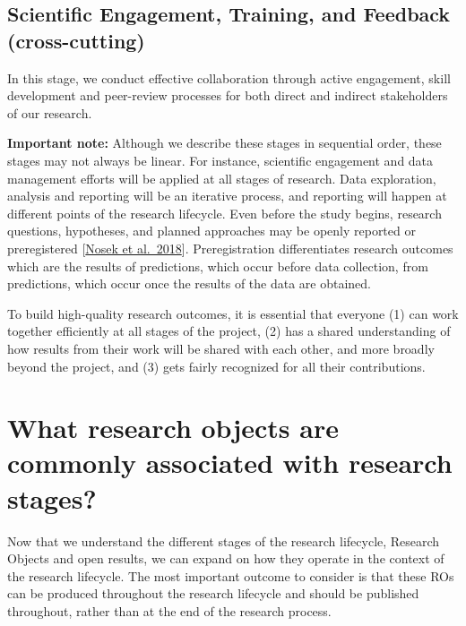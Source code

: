 \documentclass[
  letterpaper,
  DIV=11,
  numbers=noendperiod]{scrreport}
\begin{document}
\hypertarget{scientific-engagement-training-and-feedback-cross-cutting}{%
\subsection{Scientific Engagement, Training, and Feedback
(cross-cutting)}\label{scientific-engagement-training-and-feedback-cross-cutting}}

In this stage, we conduct effective collaboration through active
engagement, skill development and peer-review processes for both direct
and indirect stakeholders of our research.

\textbf{Important note:} Although we describe these stages in sequential
order, these stages may not always be linear. For instance, scientific
engagement and data management efforts will be applied at all stages of
research. Data exploration, analysis and reporting will be an iterative
process, and reporting will happen at different points of the research
lifecycle. Even before the study begins, research questions, hypotheses,
and planned approaches may be openly reported or preregistered
{[}\href{https://www.pnas.org/doi/10.1073/pnas.1708274114}{Nosek et
al.~2018}{]}. Preregistration differentiates research outcomes which are
the results of predictions, which occur before data collection, from
predictions, which occur once the results of the data are obtained.

To build high-quality research outcomes, it is essential that everyone
(1) can work together efficiently at all stages of the project, (2) has
a shared understanding of how results from their work will be shared
with each other, and more broadly beyond the project, and (3) gets
fairly recognized for all their contributions.

\hypertarget{what-research-objects-are-commonly-associated-with-research-stages}{%
\section{What research objects are commonly associated with research
stages?}\label{what-research-objects-are-commonly-associated-with-research-stages}}

Now that we understand the different stages of the research lifecycle,
Research Objects and open results, we can expand on how they operate in
the context of the research lifecycle. The most important outcome to
consider is that these ROs can be produced throughout the research
lifecycle and should be published throughout, rather than at the end of
the research process.
\end{document}
